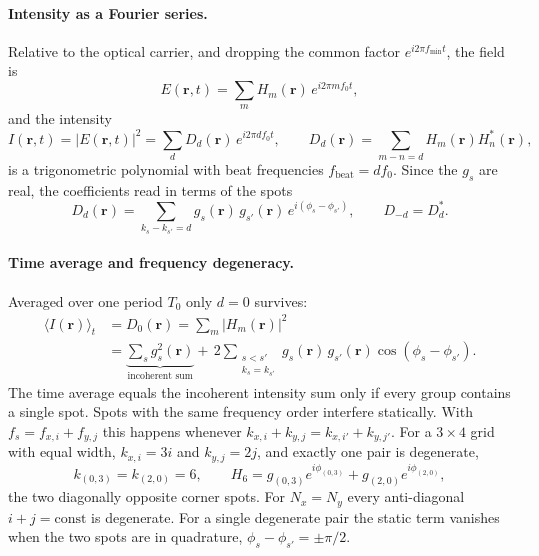 \paragraph{Intensity as a Fourier series.}
Relative to the optical carrier, and dropping the common factor
$e^{i2\pi f_{\min}t}$, the field is
\begin{equation}
E(\mathbf r,t)=\sum_m H_m(\mathbf r)\,e^{i2\pi m f_0 t},
\end{equation}
and the intensity
\begin{equation}
I(\mathbf r,t)=\left|E(\mathbf r,t)\right|^2
=\sum_d D_d(\mathbf r)\,e^{i2\pi d f_0 t},
\qquad
D_d(\mathbf r)=\sum_{m-n=d}H_m(\mathbf r)H_n^*(\mathbf r),
\end{equation}
is a trigonometric polynomial with beat frequencies $f_\mathrm{beat}=d f_0$.
Since the $g_s$ are real, the coefficients read in terms of the spots
\begin{equation}
D_d(\mathbf r)=\sum_{k_s-k_{s'}=d} g_s(\mathbf r)\,g_{s'}(\mathbf r)\,
e^{i(\phi_s-\phi_{s'})},
\qquad
D_{-d}=D_d^{*}.
\end{equation}

\paragraph{Time average and frequency degeneracy.}
Averaged over one period $T_0$ only $d=0$ survives:
\begin{equation}
\begin{split}
\langle I(\mathbf r)\rangle_t
&=D_0(\mathbf r)
=\sum_m\left|H_m(\mathbf r)\right|^2\\
&=\underbrace{\sum_s g_s^2(\mathbf r)}_{\text{incoherent sum}}
+\,2\!\!\sum_{\substack{s<s'\\ k_s=k_{s'}}}\!\! g_s(\mathbf r)\,g_{s'}(\mathbf r)
\cos(\phi_s-\phi_{s'}).
\end{split}
\end{equation}
The time average equals the incoherent intensity sum only if every group
contains a single spot. Spots with the same frequency order interfere
statically. With $f_s=f_{x,i}+f_{y,j}$ this happens whenever
$k_{x,i}+k_{y,j}=k_{x,i'}+k_{y,j'}$. For a $3\times4$ grid with equal width,
$k_{x,i}=3i$ and $k_{y,j}=2j$, and exactly one pair is degenerate,
\begin{equation}
k_{(0,3)}=k_{(2,0)}=6,
\qquad
H_6=g_{(0,3)}e^{i\phi_{(0,3)}}+g_{(2,0)}e^{i\phi_{(2,0)}},
\end{equation}
the two diagonally opposite corner spots. For $N_x=N_y$ every anti-diagonal
$i+j=\mathrm{const}$ is degenerate. For a single degenerate pair the static
term vanishes when the two spots are in quadrature, $\phi_s-\phi_{s'}=\pm\pi/2$.

